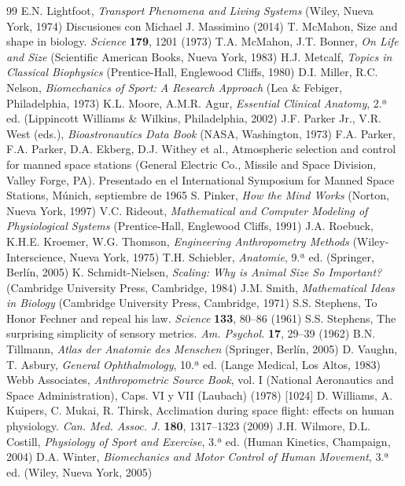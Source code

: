 \documentclass[12pt]{book}
\begin{document}
\begin{thebibliography}{99}
 E.N. Lightfoot, \textit{Transport Phenomena and Living Systems} (Wiley, Nueva York, 1974)
 Discusiones con Michael J. Massimino (2014)
 T. McMahon, Size and shape in biology. \textit{Science} \textbf{179}, 1201 (1973)
 T.A. McMahon, J.T. Bonner, \textit{On Life and Size} (Scientific American Books, Nueva York, 1983)
 H.J. Metcalf, \textit{Topics in Classical Biophysics} (Prentice-Hall, Englewood Cliffs, 1980)
 D.I. Miller, R.C. Nelson, \textit{Biomechanics of Sport: A Research Approach} (Lea \& Febiger, Philadelphia, 1973)
 K.L. Moore, A.M.R. Agur, \textit{Essential Clinical Anatomy}, 2.ª ed. (Lippincott Williams \& Wilkins, Philadelphia, 2002)
 J.F. Parker Jr., V.R. West (eds.), \textit{Bioastronautics Data Book} (NASA, Washington, 1973)
 F.A. Parker, F.A. Parker, D.A. Ekberg, D.J. Withey et al., Atmospheric selection and control for manned space stations (General Electric Co., Missile and Space Division, Valley Forge, PA). Presentado en el International Symposium for Manned Space Stations, Múnich, septiembre de 1965
 S. Pinker, \textit{How the Mind Works} (Norton, Nueva York, 1997)
 V.C. Rideout, \textit{Mathematical and Computer Modeling of Physiological Systems} (Prentice-Hall, Englewood Cliffs, 1991)
 J.A. Roebuck, K.H.E. Kroemer, W.G. Thomson, \textit{Engineering Anthropometry Methods} (Wiley-Interscience, Nueva York, 1975)
 T.H. Schiebler, \textit{Anatomie}, 9.ª ed. (Springer, Berlín, 2005)
 K. Schmidt-Nielsen, \textit{Scaling: Why is Animal Size So Important?} (Cambridge University Press, Cambridge, 1984)
 J.M. Smith, \textit{Mathematical Ideas in Biology} (Cambridge University Press, Cambridge, 1971)
 S.S. Stephens, To Honor Fechner and repeal his law. \textit{Science} \textbf{133}, 80--86 (1961)
 S.S. Stephens, The surprising simplicity of sensory metrics. \textit{Am. Psychol.} \textbf{17}, 29--39 (1962)
 B.N. Tillmann, \textit{Atlas der Anatomie des Menschen} (Springer, Berlín, 2005)
 D. Vaughn, T. Asbury, \textit{General Ophthalmology}, 10.ª ed. (Lange Medical, Los Altos, 1983)
 Webb Associates, \textit{Anthropometric Source Book}, vol. I (National Aeronautics and Space Administration), Caps. VI y VII (Laubach) (1978) [1024]
 D. Williams, A. Kuipers, C. Mukai, R. Thirsk, Acclimation during space flight: effects on human physiology. \textit{Can. Med. Assoc. J.} \textbf{180}, 1317--1323 (2009)
 J.H. Wilmore, D.L. Costill, \textit{Physiology of Sport and Exercise}, 3.ª ed. (Human Kinetics, Champaign, 2004)
 D.A. Winter, \textit{Biomechanics and Motor Control of Human Movement}, 3.ª ed. (Wiley, Nueva York, 2005)
\end{thebibliography}

\end{document}

